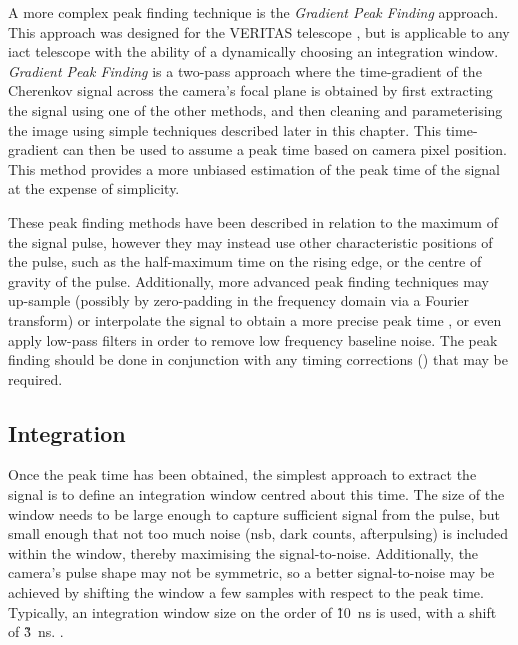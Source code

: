 A more complex peak finding technique is the \textit{Gradient Peak Finding} approach. This approach was designed for the VERITAS telescope \cite{Holder2005}\cite{Cogan2006}\cite{Cogan2007}, but is applicable to any \gls{iact} telescope with the ability of a dynamically choosing an integration window. \textit{Gradient Peak Finding} is a two-pass approach where the time-gradient of the Cherenkov signal across the camera's focal plane is obtained by first extracting the signal using one of the other methods, and then cleaning and parameterising the image using simple techniques described later in this chapter. This time-gradient can then be used to assume a peak time based on camera pixel position. This method provides a more unbiased estimation of the peak time of the signal at the expense of simplicity. 

These peak finding methods have been described in relation to the maximum of the signal pulse, however they may instead use other characteristic positions of the pulse, such as the half-maximum time on the rising edge, or the centre of gravity of the pulse. Additionally, more advanced peak finding techniques may up-sample (possibly by zero-padding in the frequency domain via a Fourier transform) or interpolate the signal to obtain a more precise peak time \cite{Cogan2006}\cite{Cogan2007}, or even apply low-pass filters in order to remove low frequency baseline noise. The peak finding should be done in conjunction with any timing corrections () that may be required.


\subsection{Integration}

Once the peak time has been obtained, the simplest approach to extract the signal is to define an integration window centred about this time. The size of the window needs to be large enough to capture sufficient signal from the pulse, but small enough that not too much noise (\gls{nsb}, dark counts, afterpulsing) is included within the window, thereby maximising the signal-to-noise. Additionally, the camera's pulse shape may not be symmetric, so a better signal-to-noise may be achieved by shifting the window a few samples with respect to the peak time. Typically, an integration window size on the order of \~10~ns is used, with a shift of \~3~ns.  .

